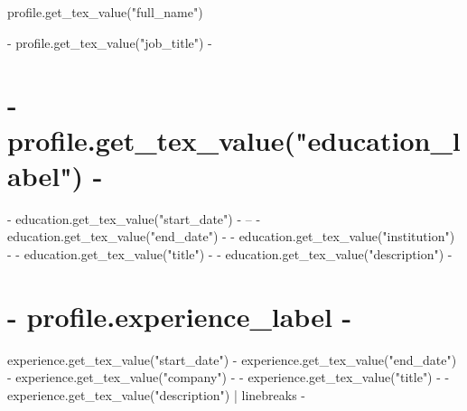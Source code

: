 \documentclass[10pt]{FreemanCV}
\begin{document}
\begin{paracol}{2} %


\parbox[][0.11\textheight][c]{\linewidth}{ %
	\centering %

	{\sffamily\Huge {{ profile.get_tex_value("full_name") }} } %

	\medskip %

	{\cursivefont\Huge\textcolor{headings}{  {{- profile.get_tex_value("job_title") -}} }}

	\vfill %
}

{%
\section{ {{- profile.get_tex_value("education_label") -}} }
{%
\jobentry
	{ {{- education.get_tex_value("start_date") -}} -- {{- education.get_tex_value("end_date") -}} }
	{} %
	{ {{- education.get_tex_value("institution") -}} }
	{ {{- education.get_tex_value("title") -}} }
	{ {{- education.get_tex_value("description") -}} }
{%
{%




{%
\section{ {{- profile.experience_label -}} }
{%
\jobentry
	{ {{ experience.get_tex_value("start_date") }} - {{ experience.get_tex_value("end_date") }} } %
	{} %
	{ {{- experience.get_tex_value("company") -}} } %
	{ {{- experience.get_tex_value("title") -}} } %
	{ {{- experience.get_tex_value("description") | linebreaks -}} } %
{%
{%




}}}}}}}}
\end{paracol}
\end{document}
